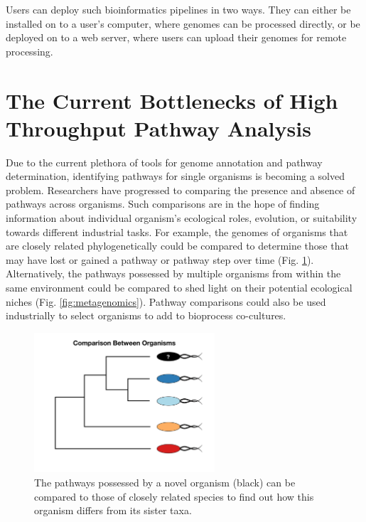 Users can deploy such bioinformatics pipelines in two ways. They can either be installed on to a user's computer, where genomes can be processed directly, or be deployed on to a web server, where users can upload their genomes for remote processing.

\section{The Current Bottlenecks of High Throughput Pathway Analysis}

Due to the current plethora of tools for genome annotation and pathway determination, identifying pathways for single organisms is becoming a solved problem. Researchers have progressed to comparing the presence and absence of pathways across organisms. Such comparisons are in the hope of finding information about individual organism's ecological roles, evolution, or suitability towards different industrial tasks. For example, the genomes of organisms that are closely related phylogenetically could be compared to determine those that may have lost or gained a pathway or pathway step over time (Fig. \ref{fig:phylogenetic-comparison}). Alternatively, the pathways possessed by multiple organisms from within the same environment could be compared to shed light on their potential ecological niches (Fig. \ref{fig:metagenomics}). Pathway comparisons could also be used industrially to select organisms to add to bioprocess co-cultures.

\begin{figure}[!ht]
  \centering
	\includegraphics[width=0.6\textwidth]{media/compare-phylogenetically.pdf}
	 \caption{The pathways possessed by a novel organism (black) can be compared to those of closely related species to find out how this organism differs from its sister taxa.}
	 \label{fig:phylogenetic-comparison}
\end{figure}

